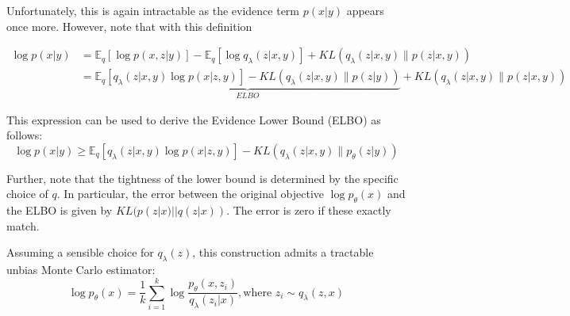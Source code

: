 Unfortunately, this is again intractable as the evidence term $p(x|y)$ appears once more. However, note that with this definition

$$
\begin{aligned}
  \log p(x|y) 
  &= 
  \mathbb{E}_{q} \left[ \log p(x,z|y) \right]
  - \mathbb{E}_{q} \left[ \log q_{\lambda}(z|x,y) \right]
  + KL(q_{\lambda}(z|x,y) \| p(z|x,y)) \\
  &= 
  \underbrace{
    \mathbb{E}_{q} \left[ q_{\lambda}(z|x,y) \log p(x|z,y) \right]
  - KL(q_{\lambda}(z|x,y) \| p(z|y))}_{ELBO}
  + KL(q_{\lambda}(z|x,y) \| p(z|x,y))
\end{aligned}
$$

This expression can be used to derive the Evidence Lower Bound (ELBO) as follows:
\begin{equation}
  \log p(x|y) 
  \geq \mathbb{E}_{q} \left[ q_{\lambda}(z|x,y) \log p(x|z,y) \right]
  - KL(q_{\lambda}(z|x,y) \| p_{\theta}(z|y))
\end{equation}

Further, note that the tightness of the lower bound is determined by the specific choice of $q$. In particular, the error between the original objective $\log p_{\theta}(x)$ and the ELBO is given by $KL(p(z|x) || q(z|x))$. The error is zero if these exactly match.





Assuming a sensible choice for $q_{\lambda}(z)$, this construction admits a tractable unbias Monte Carlo estimator:
\begin{equation}
  \log p_{\theta}(x) = \frac{1}{k} \sum_{i=1}^{k} \log \frac{p_{\theta}(x, z_{i})}{q_{\lambda}(z_{i}|x)}, \textrm{where } z_{i} \sim q_{\lambda}(z,x)
\end{equation}

